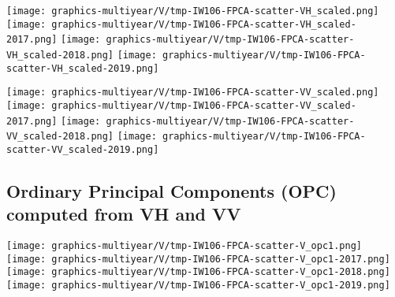 \begin{center}
\begin{minipage}{7.0in}
\texttt{[image: graphics-multiyear/V/tmp-IW106-FPCA-scatter-VH\_scaled.png]}
\quad
\texttt{[image: graphics-multiyear/V/tmp-IW106-FPCA-scatter-VH\_scaled-2017.png]}
\vskip 1.0cm
\texttt{[image: graphics-multiyear/V/tmp-IW106-FPCA-scatter-VH\_scaled-2018.png]}
\quad
\texttt{[image: graphics-multiyear/V/tmp-IW106-FPCA-scatter-VH\_scaled-2019.png]}
\end{minipage}
\end{center}


\clearpage
\begin{center}
\begin{minipage}{7.0in}
\texttt{[image: graphics-multiyear/V/tmp-IW106-FPCA-scatter-VV\_scaled.png]}
\quad
\texttt{[image: graphics-multiyear/V/tmp-IW106-FPCA-scatter-VV\_scaled-2017.png]}
\vskip 1.0cm
\texttt{[image: graphics-multiyear/V/tmp-IW106-FPCA-scatter-VV\_scaled-2018.png]}
\quad
\texttt{[image: graphics-multiyear/V/tmp-IW106-FPCA-scatter-VV\_scaled-2019.png]}
\end{minipage}
\end{center}


\clearpage

\subsection{Ordinary Principal Components (OPC) computed from VH and VV}
\label{FPCA-scatter-opc}

\begin{center}
\begin{minipage}{7.0in}
\texttt{[image: graphics-multiyear/V/tmp-IW106-FPCA-scatter-V\_opc1.png]}
\quad
\texttt{[image: graphics-multiyear/V/tmp-IW106-FPCA-scatter-V\_opc1-2017.png]}
\vskip 1.0cm
\texttt{[image: graphics-multiyear/V/tmp-IW106-FPCA-scatter-V\_opc1-2018.png]}
\quad
\texttt{[image: graphics-multiyear/V/tmp-IW106-FPCA-scatter-V\_opc1-2019.png]}
\end{minipage}
\end{center}


